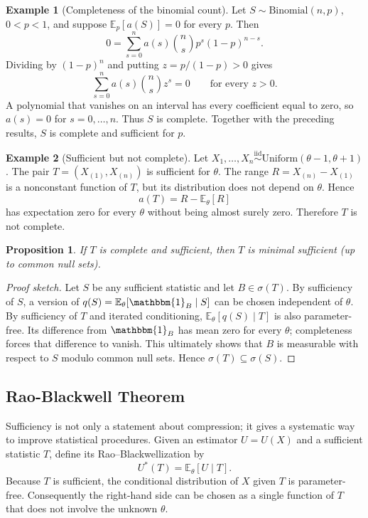 \documentclass[12pt,oneside]{book}
\numberwithin{equation}{section}
\theoremstyle{definition}
\newtheorem{example}{Example}[section]
\theoremstyle{plain}
\newtheorem{proposition}{Proposition}[section]
\theoremstyle{remark}
\newcommand{\E}{\mathbb{E}}
\newcommand{\ind}{\mathbbm{1}}
\newcommand{\iid}{\overset{\text{iid}}{\sim}}
\newcommand{\Bin}{\mathrm{Binomial}}
\begin{document}
\begin{example}[Completeness of the binomial count]
Let $S\sim\Bin(n,p)$, $0<p<1$, and suppose $\E_p[a(S)]=0$ for every $p$.
Then
\[
    0=\sum_{s=0}^n a(s)\binom ns p^s(1-p)^{n-s}.
\]
Dividing by $(1-p)^n$ and putting $z=p/(1-p)>0$ gives
\[
    \sum_{s=0}^n a(s)\binom ns z^s=0
    \qquad\text{for every }z>0.
\]
A polynomial that vanishes on an interval has every coefficient equal to
zero, so $a(s)=0$ for $s=0,\ldots,n$.  Thus $S$ is complete.  Together with
the preceding results, $S$ is complete and sufficient for $p$.
\end{example}

\begin{example}[Sufficient but not complete]
Let $X_1,\ldots,X_n\iid\mathrm{Uniform}(\theta-1,\theta+1)$.  The pair
$T=(X_{(1)},X_{(n)})$ is sufficient for $\theta$.  The range
$R=X_{(n)}-X_{(1)}$ is a nonconstant function of $T$, but its distribution
does not depend on $\theta$.  Hence
\[
    a(T)=R-\E_\theta[R]
\]
has expectation zero for every $\theta$ without being almost surely zero.
Therefore $T$ is not complete.
\end{example}

\begin{proposition}
If $T$ is complete and sufficient, then $T$ is minimal sufficient (up to
common null sets).
\end{proposition}

\begin{proof}[Proof sketch]
Let $S$ be any sufficient statistic and let $B\in\sigma(T)$.  By sufficiency
of $S$, a version of $q(S)=\E_\theta[\ind_B\mid S]$ can be chosen independent
of $\theta$.  By sufficiency of $T$ and iterated conditioning,
$\E_\theta[q(S)\mid T]$ is also parameter-free.  Its difference from
$\ind_B$ has mean zero for every $\theta$; completeness forces that
difference to vanish.  This ultimately shows that $B$ is measurable with
respect to $S$ modulo common null sets.  Hence $\sigma(T)\subseteq\sigma(S)$.
\end{proof}

\subsection{Rao-Blackwell Theorem}

Sufficiency is not only a statement about compression; it gives a systematic
way to improve statistical procedures.  Given an estimator $U=U(X)$ and a
sufficient statistic $T$, define its Rao--Blackwellization by
\[
    U^*(T)=\E_\theta[U\mid T].
\]
Because $T$ is sufficient, the conditional distribution of $X$ given $T$ is
parameter-free.  Consequently the right-hand side can be chosen as a single
function of $T$ that does not involve the unknown $\theta$.
\end{document}
